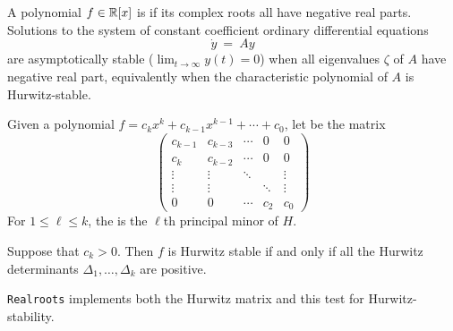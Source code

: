 A polynomial $f\in\mathbb{R}[x]$ is  if its complex roots all have negative real parts.
Solutions to the system of constant coefficient ordinary differential equations 
%
 \[
  \dot{y}\ =\ Ay
 \]
%
are asymptotically stable ($\lim_{t\to\infty}y(t)=0$) when all eigenvalues $\zeta$ of $A$ have negative real part,
equivalently when the characteristic polynomial of $A$ is Hurwitz-stable.
 
Given a polynomial $f=c_kx^k+c_{k-1}x^{k-1}+\dotsb+c_0$,  let  be the matrix
\[
\left(\begin{matrix}
  c_{k-1} & c_{k-3} & \dotsb & 0  & 0 \\
  c_k    & c_{k-2} &  \dotsb& 0 & 0 \\
  \vdots & \vdots & \ddots&    &\vdots\\
  \vdots & \vdots & & \ddots&\vdots\\
    0    &    0   & \dotsb&c_2 & c_0
\end{matrix}\right)
\]
For $1\leq \ell\leq k$, the   is the $\ell$th principal minor of $H$.


\begin{theorem}
  Suppose that $c_k>0$.
  Then $f$ is Hurwitz stable if and only if all the Hurwitz determinants $\Delta_{1},\dots,\Delta_{k}$ are positive.
\end{theorem}

{\tt Realroots} implements both the Hurwitz matrix and this test for Hurwitz-stability.
%
\begin{leftbar}

\end{leftbar}
%
